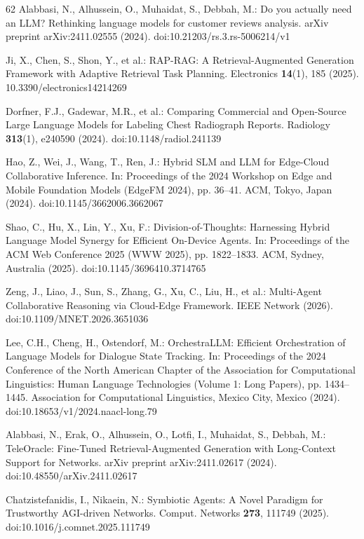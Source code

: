 \begin{thebibliography}{62}
Alabbasi, N., Alhussein, O., Muhaidat, S., Debbah, M.: Do you actually need an LLM? Rethinking language models for customer reviews analysis. arXiv preprint arXiv:2411.02555 (2024). doi:10.21203/rs.3.rs-5006214/v1

Ji, X., Chen, S., Shon, Y., et al.: RAP-RAG: A Retrieval-Augmented Generation Framework with Adaptive Retrieval Task Planning. Electronics \textbf{14}(1), 185 (2025). 10.3390/electronics14214269

Dorfner, F.J., Gadewar, M.R., et al.: Comparing Commercial and Open-Source Large Language Models for Labeling Chest Radiograph Reports. Radiology \textbf{313}(1), e240590 (2024). doi:10.1148/radiol.241139

Hao, Z., Wei, J., Wang, T., Ren, J.: Hybrid SLM and LLM for Edge-Cloud Collaborative Inference. In: Proceedings of the 2024 Workshop on Edge and Mobile Foundation Models (EdgeFM 2024), pp. 36--41. ACM, Tokyo, Japan (2024). doi:10.1145/3662006.3662067

Shao, C., Hu, X., Lin, Y., Xu, F.: Division-of-Thoughts: Harnessing Hybrid Language Model Synergy for Efficient On-Device Agents. In: Proceedings of the ACM Web Conference 2025 (WWW 2025), pp. 1822--1833. ACM, Sydney, Australia (2025). doi:10.1145/3696410.3714765

Zeng, J., Liao, J., Sun, S., Zhang, G., Xu, C., Liu, H., et al.: Multi-Agent Collaborative Reasoning via Cloud-Edge Framework. IEEE Network (2026). doi:10.1109/MNET.2026.3651036

Lee, C.H., Cheng, H., Ostendorf, M.: OrchestraLLM: Efficient Orchestration of Language Models for Dialogue State Tracking. In: Proceedings of the 2024 Conference of the North American Chapter of the Association for Computational Linguistics: Human Language Technologies (Volume 1: Long Papers), pp. 1434--1445. Association for Computational Linguistics, Mexico City, Mexico (2024). doi:10.18653/v1/2024.naacl-long.79

Alabbasi, N., Erak, O., Alhussein, O., Lotfi, I., Muhaidat, S., Debbah, M.: TeleOracle: Fine-Tuned Retrieval-Augmented Generation with Long-Context Support for Networks. arXiv preprint arXiv:2411.02617 (2024). doi:10.48550/arXiv.2411.02617

Chatzistefanidis, I., Nikaein, N.: Symbiotic Agents: A Novel Paradigm for Trustworthy AGI-driven Networks. Comput. Networks \textbf{273}, 111749 (2025). doi:10.1016/j.comnet.2025.111749


\end{thebibliography}
